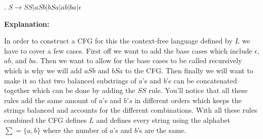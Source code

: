 \documentclass[11pt, letterpaper]{article}
\begin{document}
. $S \rightarrow SS|aSb|bSa|ab|ba|\epsilon$

\vspace{5mm}

\noindent\textbf{Explanation:}

\vspace{5mm}

\noindent In order to construct a CFG for this the context-free language defined by $L$ we have to cover a few cases. First off we want to add the base cases which include $\epsilon$, $ab$, and $ba$. Then we want to allow for the base cases to be called recursively which is why we will add $aSb$ and $bSa$ to the CFG. Then finally we will want to make it so that two balanced substrings of $a$'s and $b$'s can be concatenated together which can be done by adding the $SS$ rule. You'll notice that all these rules add the same amount of $a$'s and $b's$ in different orders which keeps the strings balanced and accounts for the different combinations. With all these rules combined the CFG defines $L$ and defines every string using the alphabet $\sum = \{a, b\}$ where the number of $a$'s and $b$'s are the same. 
\end{document}
